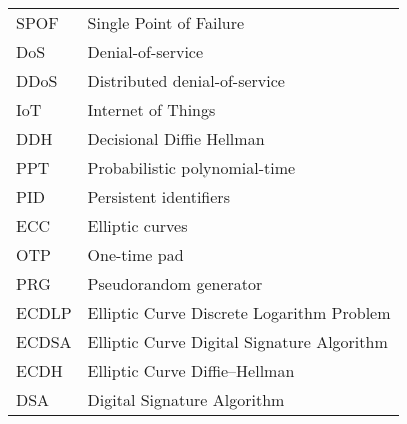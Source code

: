 \begin{center}
\begin{longtable}{ l @{\qquad} l }
	SPOF    & Single Point of Failure \\
	DoS    & Denial-of-service \\
	DDoS    & Distributed denial-of-service \\
	IoT    & Internet of Things \\
	DDH    & Decisional Diffie Hellman \\
	PPT    & Probabilistic polynomial-time \\
	PID    & Persistent identifiers \\
	ECC    & Elliptic curves \\
	OTP    & One-time pad\\
	PRG    & Pseudorandom generator\\
	ECDLP    & Elliptic Curve Discrete Logarithm Problem\\
	ECDSA    & Elliptic Curve Digital Signature Algorithm\\
	ECDH    & Elliptic Curve Diffie–Hellman\\
	DSA    & Digital Signature Algorithm\\
	\bottomrule
	\end{longtable}
\end{center}
